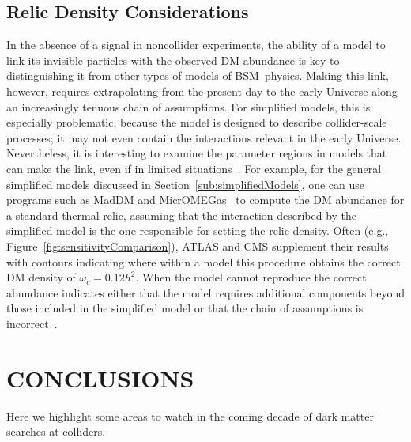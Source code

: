 \documentclass{ar-1col}
\newcommand{\IP}{invisible particle}
\begin{document}
\subsection{Relic Density Considerations}

In the absence of a signal in noncollider experiments, the ability of a
model to link its {\IP}s with the observed DM abundance is key to
distinguishing it from other types of models of BSM\ physics. Making this link, however, requires extrapolating
from the present day to the early Universe along an increasingly
tenuous chain of assumptions. For simplified models, this is
especially problematic, because the model is designed to describe
collider-scale processes; it may not even contain the interactions
relevant in the early Universe. Nevertheless, it is interesting to
examine the parameter regions in models that can make the link, even if in limited
situations~\cite{Busoni:2014gta,Catena:2017xqq}. For example, for
the general simplified models discussed in
Section~\ref{sub:simplifiedModels}, one can use programs
such as MadDM and
MicrOMEGas~\cite{Backovic:2015cra,Barducci:2016pcb} to compute  the DM
abundance for a standard thermal relic, assuming that the
interaction described by the simplified model is the one
responsible for setting the relic density. Often (e.g.,
Figure~\ref{fig:sensitivityComparison}), ATLAS and CMS supplement
their results with contours indicating where within a model this
procedure obtains the correct DM density of $\omega_c =
0.12 h^2$. When the model cannot reproduce the correct abundance indicates either that  the model requires additional
components beyond those included in the simplified model or that
the chain of assumptions is incorrect~\cite{Bernal:2017kxu}.

\section{CONCLUSIONS}\label{sec:05_Future}

Here we highlight some areas to watch in the coming decade of
dark matter searches at colliders.
\end{document}
